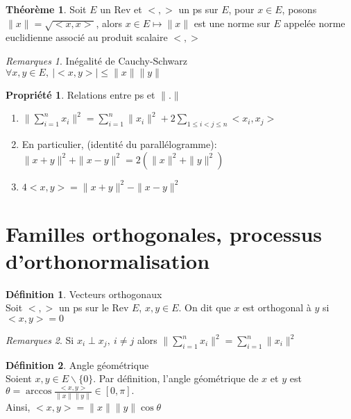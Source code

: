 \documentclass[fleqn]{article}
\theoremstyle{definition} \newtheorem*{defi}{D\'efinition}
\theoremstyle{definition} \newtheorem*{theo}{Th\'eor\`eme}
\theoremstyle{definition} \newtheorem*{coro}{Corollaire}
\theoremstyle{remark} \newtheorem*{rqs}{Remarques}
\theoremstyle{definition} \newtheorem*{prop}{Propri\'et\'e}
\begin{document}
\begin{theo} Soit $E$ un Rev et $<,>$ un ps sur $E$, pour $x \in E$, posons \mbox{$\|x\| = \sqrt{<x,x>}$}, alors $x \in E \mapsto \|x\|$ est
une norme sur $E$ appel\'ee norme euclidienne associ\'e au produit scalaire $<,>$
\end{theo}

\begin{rqs} In\'egalit\'e de Cauchy-Schwarz\\
	$\forall x,y \in E,\ |<x,y>| \leq \|x\| \|y\|$
\end{rqs}

\begin{prop} Relations entre ps et $\|.\|$
	\begin{enumerate}
		\item $\|\sum_{i=1}^n x_i \| ^2 = \sum_{i=1}^n \|x_i\|^2 + 2\sum_{1 \leq i < j \leq n} <x_i,x_j>$
		\item En particulier, (identit\'e du parall\'elogramme):\\
			$\|x+y\|^2 + \|x-y\|^2 = 2(\|x\|^2 + \|y\|^2)$
		\item $4<x,y> = \|x+y\|^2 - \|x-y\|^2$
	\end{enumerate}
\end{prop}

\section{Familles orthogonales, processus d'orthonormalisation}

\begin{defi} Vecteurs orthogonaux \\
	Soit $<,>$ un ps sur le Rev $E$, $x,y \in E$.
	On dit que $x$ est orthogonal \`a $y$ si $<x,y> = 0$

	\begin{rqs}
		Si $x_i \perp x_j,\ i \neq j$ alors $\|\sum_{i=1}^n x_i \|^2 = \sum_{i=1}^n \|x_i\|^2$
	\end{rqs}
\end{defi}

\begin{defi} Angle g\'eom\'etrique \\
Soient $x,y \in E\backslash \{0\}$. Par d\'efinition, l'angle g\'eom\'etrique de $x$ et $y$ est $\theta = \arccos
\frac{<x,y>}{\|x\| \|y\|} \in [0, \pi].$\\
Ainsi, $<x,y> = \|x\| \|y\| \cos \theta$
\end{defi}
\end{document}
